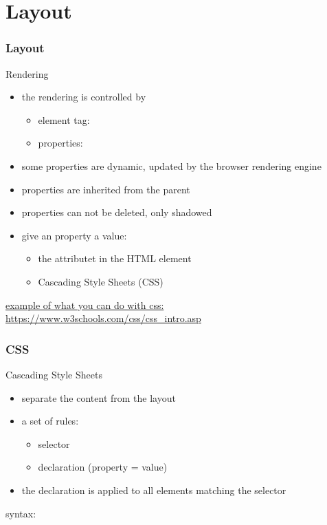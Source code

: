 \section{Layout}

\begin{frame}[fragile]
\frametitle{Layout}
\color{structure}
Rendering
\begin{itemize}\color{structure}
\item the rendering is controlled by
\begin{itemize}
  \item element tag: 
  \item properties: 
\end{itemize} 
\item some properties are dynamic, updated by the browser rendering engine
\item properties are inherited from the parent
\item properties can not be deleted, only shadowed
\item give an property a value:
\begin{itemize}\color{structure}
  \item the  attributet in the HTML element
  \item Cascading Style Sheets (CSS)
  \end{itemize}
\end{itemize}

\bigskip
\href{https://www.w3schools.com/css/css_intro.asp}{example of what you can do with css: https://www.w3schools.com/css/css\_intro.asp}
\end{frame}

\begin{frame}[fragile]
\frametitle{CSS}
\color{structure}
Cascading Style Sheets
\begin{itemize}\color{structure}
\item separate the content from the layout
\item a set of rules:
\begin{itemize}\color{structure}
  \item  selector
  \item declaration (property = value)
\end{itemize}
\item the declaration is applied to all elements matching the selector
\end{itemize}
syntax:\\ 
\end{frame}

